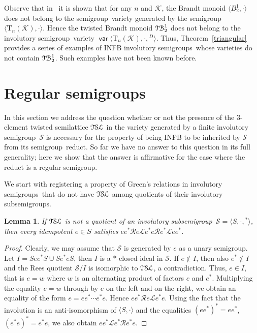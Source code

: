 \documentclass[smallextended]{svjour3}
\def\Rc{\mathrel{\mathscr{R}}}
\def\Lc{\mathrel{\mathscr{L}}}
\newcommand{\sgp}{semi\-group}
\newcommand{\sgps}{semi\-groups}
\newcommand{\is}{involutory semi\-group}
\newcommand{\iss}{involutory semi\-groups}
\newcommand{\fis}{finite involutory semi\-group}
\newcommand{\TSL}{\ensuremath{\mathcal{T\kern-.5pt S\kern-.5pt L}}}
\newcommand{\TB}{\ensuremath{\mathcal{T\kern-.5pt B}_2^1}}
\newtheorem{Lemma}[Thm]{Lemma}
\DeclareMathOperator{\var}{\mathsf{var}}
\begin{document}
Observe that in~\cite{Goldberg&Volkov:2003} it is shown that for any $n$ and $\mathcal{K}$, the Brandt monoid $\langle B_2^1,\cdot\rangle$
does not belong to the \sgp\ variety generated by the \sgp\ $\langle\mathrm{T}_n(\mathcal{K}),\cdot\rangle$. Hence the twisted Brandt
monoid $\TB$ does not belong to the \is\ variety $\var\langle\mathrm{T}_n(\mathcal{K}),\cdot,{}^D\rangle$. Thus, Theorem~\ref{triangular}
provides a series of examples of INFB \iss\ whose varieties do not contain $\TB$. Such examples have not been known before.

\section{Regular semigroups}
\label{sec:regular}

In this section we address the question whether or not the presence of the 3-element twisted semilattice $\TSL$ in the variety generated by
a \fis\ $\mathcal{S}$ is necessary for the property of being INFB to be inherited by $\mathcal{S}$ from its \sgp\ reduct. So far we have no
answer to this question in its full generality; here we show that the answer is affirmative for the case where the reduct is a regular
\sgp.

We start with registering a property of Green's relations in \iss\ that do not have $\TSL$ among quotients of their involutory sub\sgps.

\begin{Lemma}
\label{D-structure} If $\TSL$ is not a quotient of an involutory sub\sgp\ $\mathcal{S}=\langle S,\cdot,{}^*\rangle$, then every idempotent
$e\in S$ satisfies $ee^*\Rc e\Lc e^*e\Rc e^*\Lc ee^*$.
\end{Lemma}

\begin{proof}
Clearly, we may assume that $\mathcal{S}$ is generated by $e$ as a unary \sgp. Let $I=See^*S\cup Se^*eS$, then $I$ is a $*$-closed ideal in
$\mathcal{S}$. If $e\notin I$, then also $e^*\notin I$ and the Rees quotient $\mathcal{S}/I$ is isomorphic to $\TSL$, a contradiction.
Thus, $e\in I$, that is $e=w$ where $w$ is an alternating product of factors $e$ and $e^*$. Multiplying the equality $e=w$ through by $e$
on the left and on the right, we obtain an equality of the form $e=ee^*\cdots e^*e$. Hence $ee^*\Rc e\Lc e^*e$. Using the fact that the
involution is an anti-isomorphism of $\langle S,\cdot\rangle$ and the equalities $(ee^*)^*=ee^*$, $(e^*e)^*=e^*e$, we also obtain $ee^*\Lc
e^*\Rc e^*e$.
\end{proof}
\end{document}
